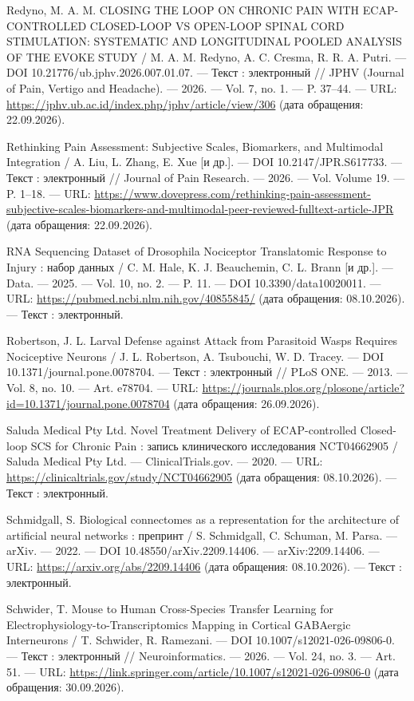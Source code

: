 \begin{list}{}{\setlength{\leftmargin}{10mm}\setlength{\labelwidth}{8mm}\setlength{\labelsep}{2mm}\setlength{\itemsep}{0pt}\setlength{\parsep}{0pt}\setlength{\topsep}{0pt}}
\item[241.] Redyno, M. A. M. CLOSING THE LOOP ON CHRONIC PAIN WITH ECAP-CONTROLLED CLOSED-LOOP VS OPEN-LOOP SPINAL CORD STIMULATION: SYSTEMATIC AND LONGITUDINAL POOLED ANALYSIS OF THE EVOKE STUDY / M. A. M. Redyno, A. C. Cresma, R. R. A. Putri. — DOI 10.21776/ub.jphv.2026.007.01.07. — Текст : электронный // JPHV (Journal of Pain, Vertigo and Headache). — 2026. — Vol. 7, no. 1. — P. 37–44. — URL: \url{https://jphv.ub.ac.id/index.php/jphv/article/view/306} (дата обращения: 22.09.2026).
\item[242.] Rethinking Pain Assessment: Subjective Scales, Biomarkers, and Multimodal Integration / A. Liu, L. Zhang, E. Xue [и др.]. — DOI 10.2147/JPR.S617733. — Текст : электронный // Journal of Pain Research. — 2026. — Vol. Volume 19. — P. 1–18. — URL: \url{https://www.dovepress.com/rethinking-pain-assessment-subjective-scales-biomarkers-and-multimodal-peer-reviewed-fulltext-article-JPR} (дата обращения: 22.09.2026).
\item[243.] RNA Sequencing Dataset of Drosophila Nociceptor Translatomic Response to Injury : набор данных / C. M. Hale, K. J. Beauchemin, C. L. Brann [и др.]. — Data. — 2025. — Vol. 10, no. 2. — P. 11. — DOI 10.3390/data10020011. — URL: \url{https://pubmed.ncbi.nlm.nih.gov/40855845/} (дата обращения: 08.10.2026). — Текст : электронный.
\item[244.] Robertson, J. L. Larval Defense against Attack from Parasitoid Wasps Requires Nociceptive Neurons / J. L. Robertson, A. Tsubouchi, W. D. Tracey. — DOI 10.1371/journal.pone.0078704. — Текст : электронный // PLoS ONE. — 2013. — Vol. 8, no. 10. — Art. e78704. — URL: \url{https://journals.plos.org/plosone/article?id=10.1371/journal.pone.0078704} (дата обращения: 26.09.2026).
\item[245.] Saluda Medical Pty Ltd. Novel Treatment Delivery of ECAP-controlled Closed-loop SCS for Chronic Pain : запись клинического исследования NCT04662905 / Saluda Medical Pty Ltd. — ClinicalTrials.gov. — 2020. — URL: \url{https://clinicaltrials.gov/study/NCT04662905} (дата обращения: 08.10.2026). — Текст : электронный.
\item[246.] Schmidgall, S. Biological connectomes as a representation for the architecture of artificial neural networks : препринт / S. Schmidgall, C. Schuman, M. Parsa. — arXiv. — 2022. — DOI 10.48550/arXiv.2209.14406. — arXiv:2209.14406. — URL: \url{https://arxiv.org/abs/2209.14406} (дата обращения: 08.10.2026). — Текст : электронный.
\item[247.] Schwider, T. Mouse to Human Cross-Species Transfer Learning for Electrophysiology-to-Transcriptomics Mapping in Cortical GABAergic Interneurons / T. Schwider, R. Ramezani. — DOI 10.1007/s12021-026-09806-0. — Текст : электронный // Neuroinformatics. — 2026. — Vol. 24, no. 3. — Art. 51. — URL: \url{https://link.springer.com/article/10.1007/s12021-026-09806-0} (дата обращения: 30.09.2026).

\end{list}
